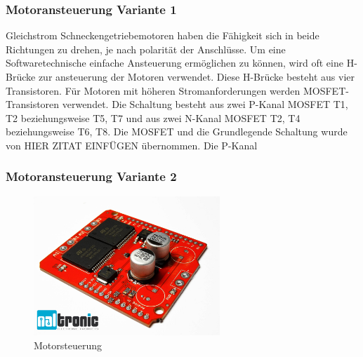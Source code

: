 \subsubsection{Motoransteuerung Variante 1}
Gleichstrom Schneckengetriebemotoren haben die Fähigkeit sich in beide Richtungen zu drehen, je nach polarität der Anschlüsse. Um eine Softwaretechnische einfache Ansteuerung ermöglichen zu können, wird oft eine H-Brücke zur ansteuerung der Motoren verwendet. Diese H-Brücke besteht aus vier Transistoren. Für Motoren mit höheren Stromanforderungen werden MOSFET-Transistoren verwendet. Die Schaltung besteht aus zwei P-Kanal MOSFET T1, T2 beziehungsweise T5, T7 und aus zwei N-Kanal MOSFET T2, T4 beziehungsweise T6, T8. Die MOSFET und die Grundlegende Schaltung wurde von HIER ZITAT EINFÜGEN übernommen. Die P-Kanal 
\subsubsection{Motoransteuerung Variante 2}
\begin{figure}[H] 
\begin{center}

\includegraphics[width=7cm]{Bilder/Bauteile/Motorsteuerung}
\caption{Motorsteuerung}
\label{Motoransteuerung}

\end{center}
\end{figure}
